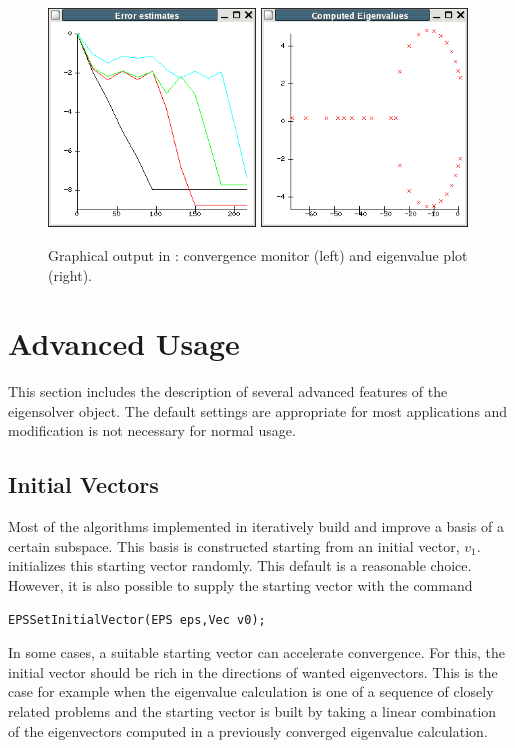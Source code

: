 \begin{figure}
  \centering
  \includegraphics[width=5.5cm]{figures/errest}
  \hspace{1cm}
  \includegraphics[width=5.5cm]{figures/eigplot}
  \caption{\label{fig:plot}Graphical output in \slepc: convergence monitor (left) and eigenvalue plot (right).}
\end{figure}

\section{Advanced Usage}

	This section includes the description of several advanced features of the eigensolver object. The default settings are appropriate for most applications and modification is not necessary for normal usage.

\subsection{Initial Vectors}

	Most of the algorithms implemented in \slepc iteratively build and improve a basis of a certain subspace. This basis is constructed starting from an initial vector, $v_1$.  initializes this starting vector randomly. This default is a reasonable choice. However, it is also possible to supply the starting vector with the command
	\begin{Verbatim}[fontsize=\small]
	EPSSetInitialVector(EPS eps,Vec v0);
	\end{Verbatim}
In some cases, a suitable starting vector can accelerate convergence. For this, the initial vector should be rich in the directions of wanted eigenvectors. This is the case for example when the eigenvalue calculation is one of a sequence of closely related problems and the starting vector is built by taking a linear combination of the eigenvectors computed in a previously converged eigenvalue calculation.


